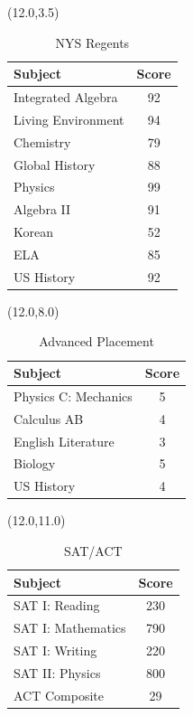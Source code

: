 \documentclass [] {report}
\begin{document}

\begin{textblock}{3.5}(12.0,3.5)
\begin{table}
\caption{NYS Regents}
\centering
\begin{tabularx}{\textwidth}{ X  c }
\toprule
{\bf Subject} & {\bf Score} \\
\midrule
Integrated Algebra & 92 \\
Living Environment & 94 \\
Chemistry & 79 \\
Global History & 88 \\
Physics & 99 \\
Algebra II & 91 \\
Korean & 52 \\
ELA & 85 \\
US History & 92 \\
\bottomrule
\end{tabularx}
\end{table}
\end{textblock}

\begin{textblock}{3.5}(12.0,8.0)
\begin{table}
\caption{Advanced Placement}
\centering
\begin{tabularx}{\textwidth}{ X  c}
\toprule
{\bf Subject} & {\bf Score} \\
\midrule
Physics C: Mechanics & 5 \\
Calculus AB & 4 \\
English Literature & 3 \\
Biology & 5 \\
US History & 4 \\
\bottomrule
\end{tabularx}
\end{table}
\end{textblock}

\begin{textblock}{3.5}(12.0,11.0)
\begin{table}
\caption{SAT/ACT}
\centering
\begin{tabularx}{\textwidth}{ X  c}
\toprule
{\bf Subject} & {\bf Score} \\
\midrule
SAT I: Reading & 230 \\
SAT I: Mathematics & 790 \\
SAT I: Writing & 220 \\
SAT II: Physics & 800 \\
ACT Composite & 29 \\
\bottomrule
\end{tabularx}
\end{table}
\end{textblock}
\end{document}
